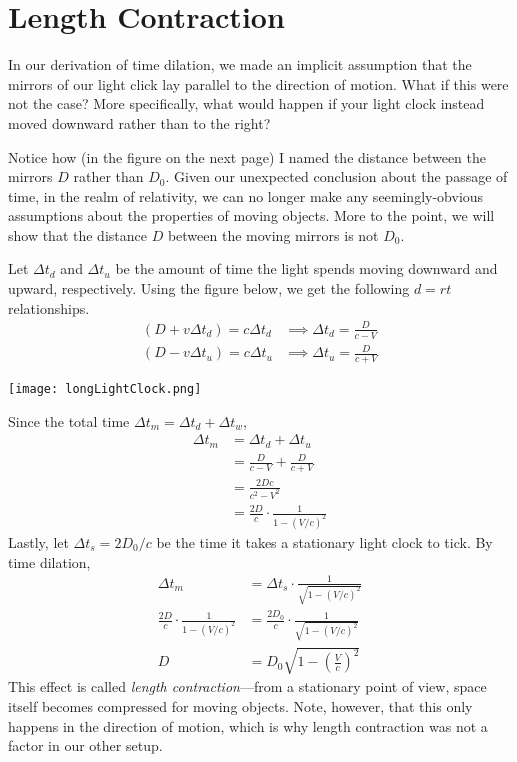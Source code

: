 \documentclass[../p023main.tex]{subfiles}
\begin{document}
\section{Length Contraction}
In our derivation of time dilation, we made an implicit assumption that the mirrors of our light click lay parallel to the direction of motion.
What if this were not the case?
More specifically, what would happen if your light clock instead moved downward rather than to the right?

Notice how (in the figure on the next page) I named the distance between the mirrors $D$ rather than $D_0$.
Given our unexpected conclusion about the passage of time, in the realm of relativity, we can no longer make any seemingly-obvious assumptions about the properties of moving objects.
More to the point, we will show that the distance $D$ between the moving mirrors is not $D_0$.

Let $\Delta t_d$ and $\Delta t_u$ be the amount of time the light spends moving downward and upward, respectively.
Using the figure below, we get the following $d = rt$ relationships.
\begin{align*}
    (D + v \Delta t_d) = c \Delta t_d &\implies \Delta t_d = \frac{D}{c - V} \\
    (D - v \Delta t_u) = c \Delta t_u &\implies \Delta t_u = \frac{D}{c + V}
\end{align*}
\begin{center}
    \texttt{[image: longLightClock.png]}
\end{center}
Since the total time $\Delta t_m = \Delta t_d + \Delta t_w$,
\begin{align*}
    \Delta t_m &= \Delta t_d + \Delta t_u \\
    &= \frac{D}{c - V} + \frac{D}{c + V} \\
    &= \frac{2Dc}{c^2 - V^2} \\
    &= \frac{2D}{c} \cdot \frac{1}{1 - \left( V / c \right)^2}
\end{align*}
Lastly, let $\Delta t_s = 2D_0 / c$ be the time it takes a stationary light clock to tick.
By time dilation,
\begin{align*}
    \Delta t_m &= \Delta t_s \cdot \frac{1}{\sqrt{1 - \left( V / c \right)^2}} \\
    \frac{2D}{c} \cdot \frac{1}{1 - \left( V / c \right)^2} &= \frac{2D_0}{c} \cdot \frac{1}{\sqrt{1 - \left( V / c \right)^2}} \\
    D &= D_0 \sqrt{1 - \left( \frac{V}{c} \right)^2}
\end{align*}
This effect is called \textit{length contraction}---from a stationary point of view, space itself becomes compressed for moving objects.
Note, however, that this only happens in the direction of motion, which is why length contraction was not a factor in our other setup.
\end{document}
